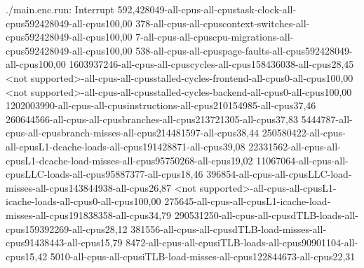 ./main.enc.run: Interrupt
592,428049-all-cpus-all-cpustask-clock-all-cpus592428049-all-cpus100,00
378-all-cpus-all-cpuscontext-switches-all-cpus592428049-all-cpus100,00
7-all-cpus-all-cpuscpu-migrations-all-cpus592428049-all-cpus100,00
538-all-cpus-all-cpuspage-faults-all-cpus592428049-all-cpus100,00
1603937246-all-cpus-all-cpuscycles-all-cpus158436038-all-cpus28,45
<not supported>-all-cpus-all-cpusstalled-cycles-frontend-all-cpus0-all-cpus100,00
<not supported>-all-cpus-all-cpusstalled-cycles-backend-all-cpus0-all-cpus100,00
1202003990-all-cpus-all-cpusinstructions-all-cpus210154985-all-cpus37,46
260644566-all-cpus-all-cpusbranches-all-cpus213721305-all-cpus37,83
5444787-all-cpus-all-cpusbranch-misses-all-cpus214481597-all-cpus38,44
250580422-all-cpus-all-cpusL1-dcache-loads-all-cpus191428871-all-cpus39,08
22331562-all-cpus-all-cpusL1-dcache-load-misses-all-cpus95750268-all-cpus19,02
11067064-all-cpus-all-cpusLLC-loads-all-cpus95887377-all-cpus18,46
396854-all-cpus-all-cpusLLC-load-misses-all-cpus143844938-all-cpus26,87
<not supported>-all-cpus-all-cpusL1-icache-loads-all-cpus0-all-cpus100,00
275645-all-cpus-all-cpusL1-icache-load-misses-all-cpus191838358-all-cpus34,79
290531250-all-cpus-all-cpusdTLB-loads-all-cpus159392269-all-cpus28,12
381556-all-cpus-all-cpusdTLB-load-misses-all-cpus91438443-all-cpus15,79
8472-all-cpus-all-cpusiTLB-loads-all-cpus90901104-all-cpus15,42
5010-all-cpus-all-cpusiTLB-load-misses-all-cpus122844673-all-cpus22,31
